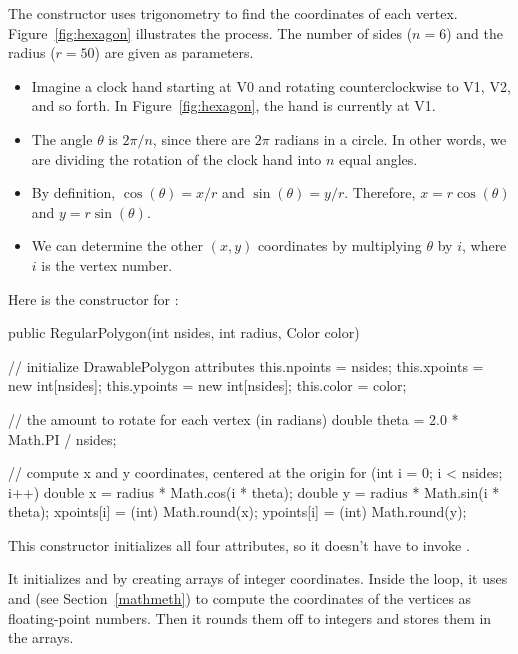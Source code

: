 The constructor uses trigonometry to find the coordinates of each vertex.
Figure~\ref{fig:hexagon} illustrates the process.
The number of sides ($n=6$) and the radius ($r=50$) are given as parameters.

\begin{itemize}

\item Imagine a clock hand starting at V0 and rotating counterclockwise to V1, V2, and so forth.
In Figure~\ref{fig:hexagon}, the hand is currently at V1.

\item The angle $\theta$ is $2 \pi / n$, since there are $2\pi$ radians in a circle.
In other words, we are dividing the rotation of the clock hand into $n$ equal angles.

\item By definition, $\cos(\theta) = x/r$ and $\sin(\theta) = y/r$.
Therefore, $x = r \cos(\theta)$ and $y = r \sin(\theta)$.

\item We can determine the other $(x, y)$ coordinates by multiplying $\theta$ by $i$, where $i$ is the vertex number.

\end{itemize}

Here is the constructor for :

\begin{code}
public RegularPolygon(int nsides, int radius, Color color) {

    // initialize DrawablePolygon attributes
    this.npoints = nsides;
    this.xpoints = new int[nsides];
    this.ypoints = new int[nsides];
    this.color = color;

    // the amount to rotate for each vertex (in radians)
    double theta = 2.0 * Math.PI / nsides;

    // compute x and y coordinates, centered at the origin
    for (int i = 0; i < nsides; i++) {
        double x = radius * Math.cos(i * theta);
        double y = radius * Math.sin(i * theta);
        xpoints[i] = (int) Math.round(x);
        ypoints[i] = (int) Math.round(y);
    }
}
\end{code}

This constructor initializes all four  attributes, so it doesn't have to invoke .

It initializes  and  by creating arrays of integer coordinates.
Inside the  loop, it uses  and  (see Section~\ref{mathmeth}) to compute the coordinates of the vertices as floating-point numbers.
Then it rounds them off to integers and stores them in the arrays.

